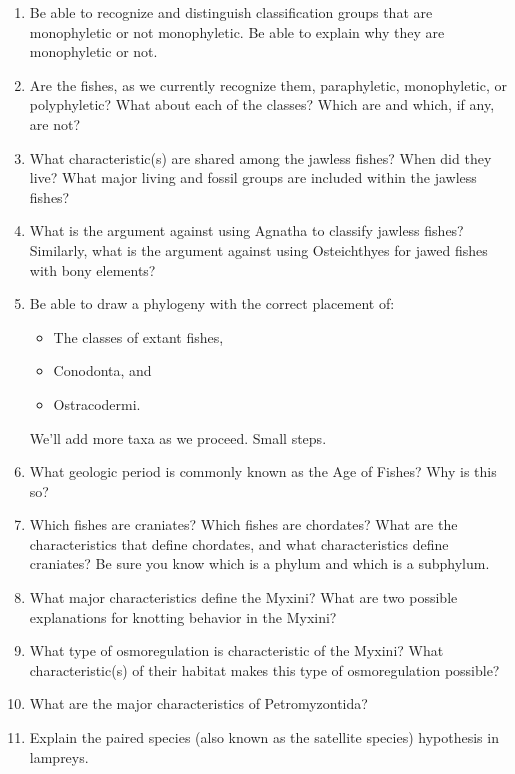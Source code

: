\documentclass[nofonts, letterpaper]{tufte-handout}
\begin{document}
\begin{enumerate}
	\item Be able to recognize and distinguish classification groups that are monophyletic or not monophyletic.  Be able to explain why they are monophyletic or not.

	\item Are the fishes, as we currently recognize them, paraphyletic, monophyletic, or polyphyletic?  What about each of the classes? Which are and which, if any, are not?

	\item What characteristic(s) are shared among the jawless fishes?  When did they live? What major living and fossil groups are included within the jawless fishes?

	\item What is the argument against using Agnatha to classify jawless fishes?  Similarly, what is the argument against using Osteichthyes for jawed fishes with bony elements?

	\item Be able to draw a phylogeny with the correct placement of:
	\begin{itemize}
		\item The classes of extant fishes,
		\item Conodonta, and
		\item Ostracodermi.
	\end{itemize}
	We’ll add more taxa as we proceed.  Small steps.
	
	\item What geologic period is commonly known as the Age of Fishes?  Why is this so?

	\item Which fishes are craniates?  Which fishes are chordates?  What are the characteristics that define chordates, and what characteristics define craniates?  Be sure you know which is a phylum and which is a subphylum.
	
		\item What major characteristics define the Myxini?  What are two possible explanations for knotting behavior in the Myxini?

	\item What type of osmoregulation is characteristic of the Myxini?  What characteristic(s) of their habitat makes this type of osmoregulation possible?

	\item What are the major characteristics of Petromyzontida?

	\item Explain the paired species (also known as the satellite species) hypothesis in lampreys.  

\end{enumerate}
\end{document}
